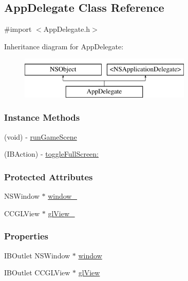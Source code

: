 \hypertarget{interface_app_delegate}{\subsection{App\-Delegate Class Reference}
\label{dd/d52/interface_app_delegate}
}


{\ttfamily \#import $<$App\-Delegate.\-h$>$}

Inheritance diagram for App\-Delegate\-:\begin{figure}[H]
\begin{center}
\leavevmode
\includegraphics[height=2.000000cm]{dd/d52/interface_app_delegate}
\end{center}
\end{figure}
\subsubsection*{Instance Methods}
\begin{DoxyCompactItemize}
\item 
(void) -\/ \hyperlink{interface_app_delegate_aa03ed24826ea60753de347b0ab33adfb}{run\-Game\-Scene}
\item 
(I\-B\-Action) -\/ \hyperlink{interface_app_delegate_ae9916ea37adae8d345a8008be3aa054f}{toggle\-Full\-Screen\-:}
\end{DoxyCompactItemize}
\subsubsection*{Protected Attributes}
\begin{DoxyCompactItemize}
\item 
N\-S\-Window $\ast$ \hyperlink{interface_app_delegate_a5338c82d195ce50c948cbbf1b974665b}{window\-\_\-}
\item 
C\-C\-G\-L\-View $\ast$ \hyperlink{interface_app_delegate_a5f256d1ae550f33820c6730d70088694}{gl\-View\-\_\-}
\end{DoxyCompactItemize}
\subsubsection*{Properties}
\begin{DoxyCompactItemize}
\item 
I\-B\-Outlet N\-S\-Window $\ast$ \hyperlink{interface_app_delegate_acdf10c46711b4d6a8d95def15620afb6}{window}
\item 
I\-B\-Outlet C\-C\-G\-L\-View $\ast$ \hyperlink{interface_app_delegate_aa68fb87b4f494cd1f0a0ef7d55590a17}{gl\-View}
\end{DoxyCompactItemize}


